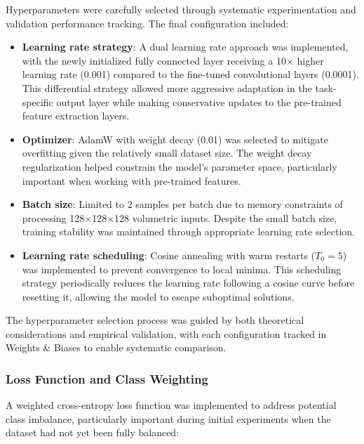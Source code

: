 \documentclass[12pt, a4paper]{article}
\begin{document}
Hyperparameters were carefully selected through systematic experimentation and validation performance tracking. The final configuration included:

\begin{itemize}
    \item \textbf{Learning rate strategy}: A dual learning rate approach was implemented, with the newly initialized fully connected layer receiving a 10× higher learning rate (0.001) compared to the fine-tuned convolutional layers (0.0001). This differential strategy allowed more aggressive adaptation in the task-specific output layer while making conservative updates to the pre-trained feature extraction layers.
    
    \item \textbf{Optimizer}: AdamW with weight decay (0.01) was selected to mitigate overfitting given the relatively small dataset size. The weight decay regularization helped constrain the model's parameter space, particularly important when working with pre-trained features.
    
    \item \textbf{Batch size}: Limited to 2 samples per batch due to memory constraints of processing 128$\times$128$\times$128 volumetric inputs. Despite the small batch size, training stability was maintained through appropriate learning rate selection.
    
    \item \textbf{Learning rate scheduling}: Cosine annealing with warm restarts ($T_0=5$) was implemented to prevent convergence to local minima. This scheduling strategy periodically reduces the learning rate following a cosine curve before resetting it, allowing the model to escape suboptimal solutions.
\end{itemize}

The hyperparameter selection process was guided by both theoretical considerations and empirical validation, with each configuration tracked in Weights \& Biases to enable systematic comparison.

\subsubsection{Loss Function and Class Weighting}

A weighted cross-entropy loss function was implemented to address potential class imbalance, particularly important during initial experiments when the dataset had not yet been fully balanced:
\end{document}

